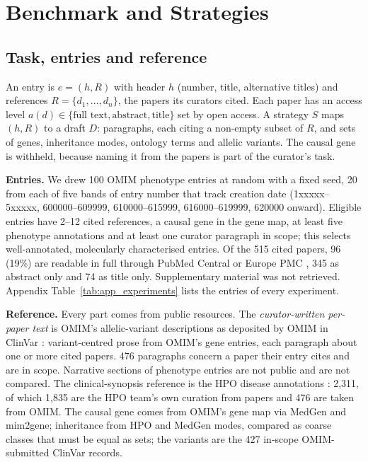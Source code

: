 \documentclass{article} %
\begin{document}
\section{Benchmark and Strategies}
\label{sec:method}
\subsection{Task, entries and reference}
\label{sec:task}
An entry is $e=(h,R)$ with header $h$ (number, title, alternative titles) and references $R=\{d_1,\dots,d_n\}$, the papers its curators cited. Each paper has an access level $a(d)\in\{\text{full text},\text{abstract},\text{title}\}$ set by open access. A strategy $S$ maps $(h,R)$ to a draft $D$: paragraphs, each citing a non-empty subset of $R$, and sets of genes, inheritance modes, ontology terms and allelic variants. The causal gene is withheld, because naming it from the papers is part of the curator's task.

\textbf{Entries.} We drew 100 OMIM phenotype entries at random with a fixed seed, 20 from each of five bands of entry number that track creation date (1xxxxx--5xxxxx, 600000--609999, 610000--615999, 616000--619999, 620000 onward). Eligible entries have 2--12 cited references, a causal gene in the gene map, at least five phenotype annotations and at least one curator paragraph in scope; this selects well-annotated, molecularly characterised entries. Of the 515 cited papers, 96 (19\%) are readable in full through PubMed Central or Europe PMC \citep{rosonovski2024europe}, 345 as abstract only and 74 as title only. Supplementary material was not retrieved. Appendix Table~\ref{tab:app_experiments} lists the entries of every experiment.

\textbf{Reference.} Every part comes from public resources. The \emph{curator-written per-paper text} is OMIM's allelic-variant descriptions as deposited by OMIM in ClinVar \citep{landrum2025clinvar}: variant-centred prose from OMIM's gene entries, each paragraph about one or more cited papers. 476 paragraphs concern a paper their entry cites and are in scope. Narrative sections of phenotype entries are not public and are not compared. The clinical-synopsis reference is the HPO disease annotations \citep{gargano2024human}: 2,311, of which 1,835 are the HPO team's own curation from papers and 476 are taken from OMIM. The causal gene comes from OMIM's gene map via MedGen \citep{Louden2020MedgenNcbis} and mim2gene; inheritance from HPO and MedGen modes, compared as coarse classes that must be equal as sets; the variants are the 427 in-scope OMIM-submitted ClinVar records.
\end{document}
